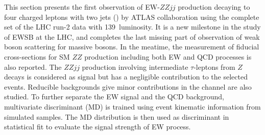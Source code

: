 This section presents the first observation of EW-$ZZjj$ production decaying to four charged leptons with two jets (\lllljj) by ATLAS collaboration using the complete set of the LHC run-2 data with 139~\ifb luminosity.
It is a new milestone in the study of EWSB at the LHC, and completes the last missing part of observation of weak boson scattering for massive bosons.
In the meatime, the measurement of fiducial cross-sections for SM $ZZ$ production including both EW and QCD processes is also reported.
The $ZZjj$ production involving intermediate $\tau$-leptons from $Z$ decays is considered as signal but has a negligible contribution to the selected events.
Reducible backgrounds give minor contributions in the \lllljj channel are also studied.
To further separate the EW signal and the QCD background, multivariate discriminant (MD) is trained using event kinematic information from simulated samples. 
The MD distribution is then used as discriminant in statistical fit to evaluate the signal strength of EW process.
